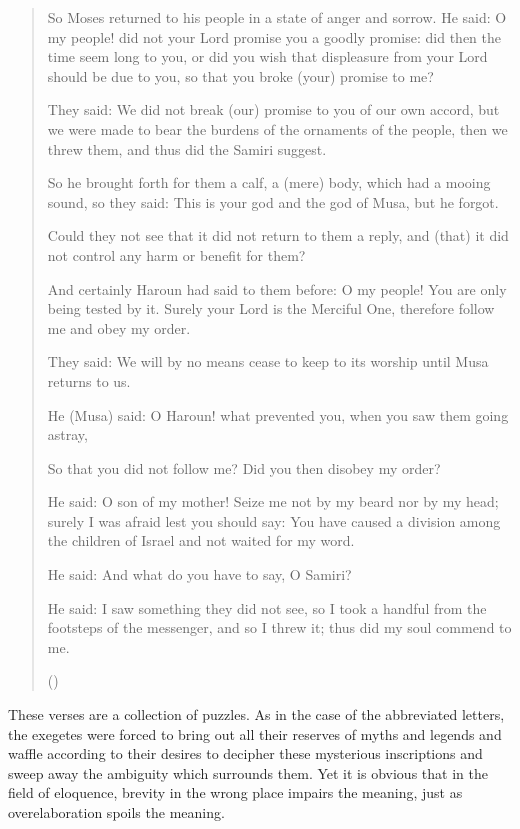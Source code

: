 \documentclass[12pt]{memoir}
\begin{document}
\begin{quote}
So Moses returned to his people in a state of anger and sorrow.
He said: O my people! did not your Lord promise you a goodly promise:
did then the time seem long to you,
or did you wish that displeasure from your Lord should be due to you,
so that you broke (your) promise to me?

They said: We did not break (our) promise to you of our own accord,
but we were made to bear the burdens of the ornaments of the people,
then we threw them, and thus did the Samiri suggest.

So he brought forth for them a calf, a (mere) body,
which had a mooing sound, so they said:
This is your god and the god of Musa, but he forgot.

Could they not see that it did not return to them a reply,
and (that) it did not control any harm or benefit for them?

And certainly Haroun had said to them before:
O my people! You are only being tested by it.
Surely your Lord is the Merciful One,
therefore follow me and obey my order.

They said: We will by no means cease to keep to its worship
until Musa returns to us.

He (Musa) said: O Haroun! what prevented you,
when you saw them going astray,

So that you did not follow me? Did you then disobey my order?

He said: O son of my mother!
Seize me not by my beard nor by my head;
surely I was afraid lest you should say:
You have caused a division among the children of Israel
and not waited for my word.

He said: And what do you have to say, O Samiri?

He said: I saw something they did not see,
so I took a handful from the footsteps of the messenger,
and so I threw it; thus did my soul commend to me.

()
\end{quote}

These verses are a collection of puzzles.
As in the case of the abbreviated letters,
the exegetes were forced to bring out all their reserves of myths
and legends and waffle according to their desires to decipher
these mysterious inscriptions and sweep away the ambiguity
which surrounds them.
Yet it is obvious that in the field of eloquence,
brevity in the wrong place impairs the meaning,
just as over\–elaboration spoils the meaning.
\end{document}
